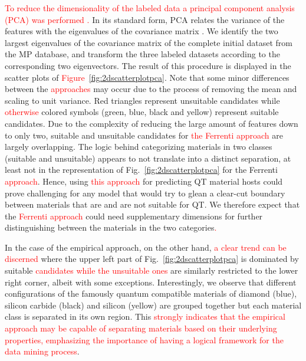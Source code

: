 \documentclass[superscriptaddress,unsortedaddress,
 amsmath,amssymb,
 aps,
]{revtex4-2}
\newcommand{\mrk}[1]{\textcolor{red}{#1}}
\begin{document}
\mrk{To reduce the dimensionality of the labeled data a principal component analysis (PCA) was performed \cite{Jolliffe2002}.} In its standard  form, PCA relates the variance of the features with the eigenvalues of the covariance matrix \cite{Jolliffe2002,Murphy2012,Hastie2009}. We identify the two largest eigenvalues of the covariance matrix \cite{Hastie2009} of the complete initial dataset from the MP database, and transform the three labeled datasets according to the corresponding two eigenvectors.
The result of this procedure is displayed in the scatter plots of \mrk{Figure}~\ref{fig:2dscatterplotpca}. Note that some minor differences between the \mrk{approaches} may occur due to the process of removing the mean and scaling to unit variance. Red triangles represent unsuitable candidates while \mrk{otherwise} colored symbols (green, blue, black and yellow) represent suitable candidates. 
Due to the complexity of reducing the large amount of features down to only two, suitable and unsuitable candidates for \mrk{the Ferrenti approach} are largely overlapping. 
The logic behind categorizing materials in two classes (suitable and unsuitable) appears to not translate into a distinct separation, at least not in the representation of Fig.~\ref{fig:2dscatterplotpca} for the Ferrenti \mrk{approach}.  
Hence, using \mrk{this approach} for predicting QT material hosts could prove challenging for any model that would try to glean a clear-cut boundary between materials that are and are not suitable for QT. 
We therefore expect that the \mrk{Ferrenti approach} could need supplementary dimensions for further distinguishing between the materials in the two categories\mrk{.} 

In the case of the empirical approach, on the other hand, \mrk{a clear trend can be discerned} where the upper left part of Fig.~\ref{fig:2dscatterplotpca} is dominated by suitable  %
\mrk{candidates while the unsuitable ones} are similarly restricted to the lower right corner, albeit with some exceptions. 
Interestingly, we observe that different configurations of the famously quantum compatible materials of diamond (blue), silicon carbide (black) and silicon (yellow) are grouped together but each material class is separated in its own region. 
This \mrk{strongly indicates that the empirical approach may be capable of separating materials based on their underlying properties, emphasizing the importance of having a logical framework for the data mining process}. %
\end{document}
